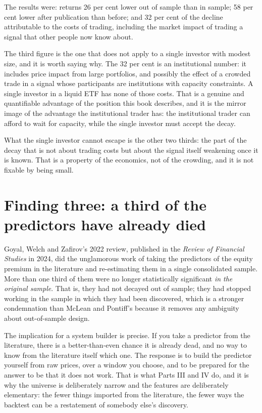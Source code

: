 The results were: returns 26 per cent lower out of sample than in sample;
58 per cent lower after publication than before; and 32 per cent of the
decline attributable to the costs of trading, including the market impact of
trading a signal that other people now know about.

The third figure is the one that does not apply to a single investor with
modest size, and it is worth saying why. The 32 per cent is an institutional
number: it includes price impact from large portfolios, and possibly the
effect of a crowded trade in a signal whose participants are institutions
with capacity constraints. A single investor in a liquid ETF has none of
those costs. That is a genuine and quantifiable advantage of the position
this book describes, and it is the mirror image of the advantage the
institutional trader has: the institutional trader can afford to wait for
capacity, while the single investor must accept the decay.

What the single investor cannot escape is the other two thirds: the part of
the decay that is not about trading costs but about the signal itself
weakening once it is known. That is a property of the economics, not of the
crowding, and it is not fixable by being small.

\section{Finding three: a third of the predictors have already died}

Goyal, Welch and Zafirov's 2022 review, published in the \emph{Review of
Financial Studies} in 2024, did the unglamorous work of taking the
predictors of the equity premium in the literature and re-estimating them
in a single consolidated sample. More than one third of them were no longer
statistically significant \emph{in the original sample}. That is, they had
not decayed out of sample; they had stopped working in the sample in which
they had been discovered, which is a stronger condemnation than McLean and
Pontiff's because it removes any ambiguity about out-of-sample design.

The implication for a system builder is precise. If you take a predictor
from the literature, there is a better-than-even chance it is already
dead, and no way to know from the literature itself which one. The
response is to build the predictor yourself from raw prices, over a window
you choose, and to be prepared for the answer to be that it does not work.
That is what Parts III and IV do, and it is why the universe is
deliberately narrow and the features are deliberately elementary: the fewer
things imported from the literature, the fewer ways the backtest can be a
restatement of somebody else's discovery.


